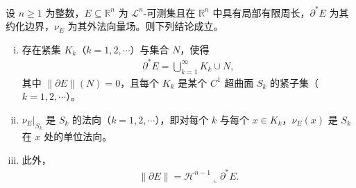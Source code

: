 \documentclass[../../main.tex]{subfiles}%
\begin{document}
\begin{theorem}[有限周长集的结构定理]\label{theorem:ch05-5-15}
设 $n\geqslant1$ 为整数，$E\subseteq\mathbb{R}^n$ 为 $\mathcal{L}^n$-可测集且在 $\mathbb{R}^n$ 中具有局部有限周长，$\partial^*E$ 为其约化边界，$\nu_E$ 为其外法向量场。则下列结论成立。
\begin{enumerate}[(i)]
\item 存在紧集 $K_k$（$k=1,2,\cdots$）与集合 $N$，使得
\begin{align*}
\partial^*E=\bigcup_{k=1}^{\infty}K_k\cup N,
\end{align*}
其中 $\lVert\partial E\rVert(N)=0$，且每个 $K_k$ 是某个 $C^1$ 超曲面 $S_k$ 的紧子集（$k=1,2,\cdots$）。
\item $\nu_E|_{S_k}$ 是 $S_k$ 的法向（$k=1,2,\cdots$），即对每个 $k$ 与每个 $x\in K_k$，$\nu_E(x)$ 是 $S_k$ 在 $x$ 处的单位法向。
\item 此外，
\begin{align*}
\lVert\partial E\rVert=\mathcal{H}^{n-1}\llcorner\partial^*E .
\end{align*}
\end{enumerate}
\end{theorem}
\end{document}
